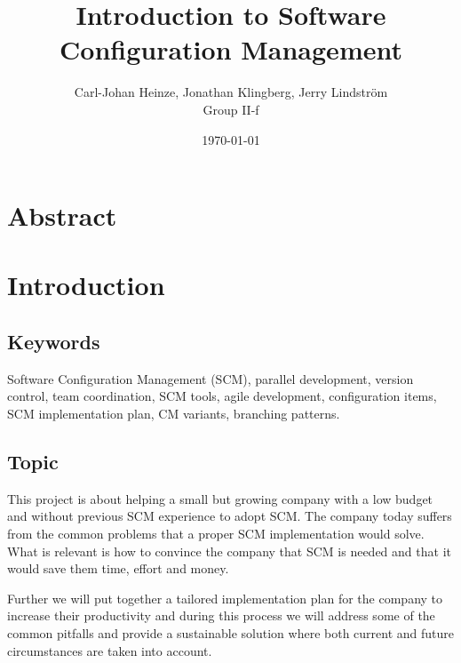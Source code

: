\documentclass[10pt]{article}
\begin{document}
\makeatletter
\renewcommand{\@biblabel}[1]{\quad#1.}
\makeatother


\pagestyle{myheadings}



\begin{titlepage}
\title{Introduction to Software Configuration Management}
\author{Carl-Johan Heinze, Jonathan Klingberg, Jerry Lindström \\Group II-f}
\date{\today}
\maketitle
\thispagestyle{empty}
\end{titlepage}

\tableofcontents
\thispagestyle{empty}
\newpage
{}

\section{Abstract}
\section{Introduction}
\subsection{Keywords}
Software Configuration Management (SCM), parallel development, version control, team coordination, SCM tools, agile development, configuration items, SCM implementation plan, CM variants, branching patterns.

\subsection{Topic}
This project is about helping a small but growing company with a low budget and without previous SCM experience to adopt SCM. The company today suffers from the common problems that a proper SCM implementation would solve. What is relevant is how to convince the company that SCM is needed and that it would save them time, effort and money. 

\noindent Further we will put together a tailored implementation plan for the company to increase their productivity and during this process we will address some of the common pitfalls and provide a sustainable solution where both current and future circumstances are taken into account.
\end{document}
